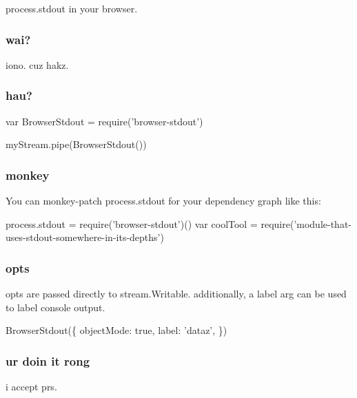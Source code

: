 {\ttfamily process.\+stdout} in your browser.

\subsubsection*{wai?}

iono. cuz hakz.

\subsubsection*{hau?}


\begin{DoxyCode}
var BrowserStdout = require('browser-stdout')

myStream.pipe(BrowserStdout())
\end{DoxyCode}


\subsubsection*{monkey}

You can monkey-\/patch {\ttfamily process.\+stdout} for your dependency graph like this\+:


\begin{DoxyCode}
process.stdout = require('browser-stdout')()
var coolTool = require('module-that-uses-stdout-somewhere-in-its-depths')
\end{DoxyCode}


\subsubsection*{opts}

opts are passed directly to {\ttfamily stream.\+Writable}. additionally, a label arg can be used to label console output.


\begin{DoxyCode}
BrowserStdout(\{
  objectMode: true,
  label: 'dataz',
\})
\end{DoxyCode}


\subsubsection*{ur doin it rong}

i accept pr\textquotesingle{}s. 